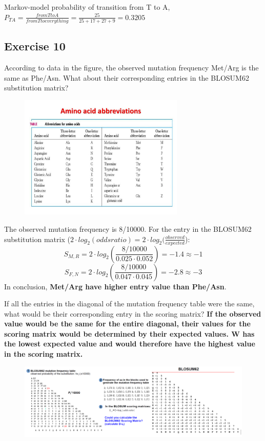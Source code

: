 Markov-model probability of transition from T to A, $P_{TA} = \frac{from T to A}{from T to everything} = \frac{25}{25 + 17 + 27 + 9} = 0.3205$

\subsection{Exercise 10}
According to data in the figure, the observed mutation frequency Met/Arg is the same as Phe/Asn. What about their corresponding entries in the BLOSUM62 substitution matrix?

\begin{figure}[htbp]
\centering
\includegraphics[width = 0.7\textwidth]{figs/aa_abbreviations.png}
\end{figure}

The observed mutation frequency is 8/10000. For the entry in the BLOSUM62 substitution matrix ($2 \cdot log_2 (odds ratio) = 2 \cdot log_2 (\frac{observed}{expected}$):
$$S_{M, R} = 2 \cdot log_2 (\frac{8/10000}{0.025 \cdot 0.052}) = -1.4 \approx -1$$
$$S_{F, N} = 2 \cdot log_2 (\frac{8/10000}{0.047 \cdot 0.045}) = -2.8 \approx -3$$
In conclusion, \textbf{Met/Arg have higher entry value than Phe/Asn}.

If all the entries in the diagonal of the mutation frequency table were the same, what would be their corresponding entry in the scoring matrix? \textbf{If the observed value would be the same for the entire diagonal, their values for the scoring matrix would be determined by their expected values. W has the lowest expected value and would therefore have the highest value in the scoring matrix.}

\begin{figure}[htbp]
\centering
\includegraphics[width = \textwidth]{figs/ejercicio-blosum.png}
\end{figure}

